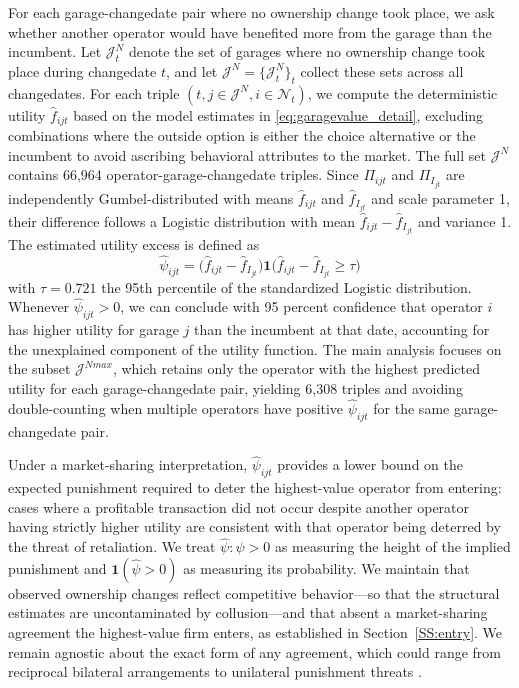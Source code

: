\documentclass[12pt]{article}
\begin{document}
For each garage-changedate pair where no ownership change took place, we 
ask whether another operator would have benefited more from the garage than 
the incumbent. Let $\mathcal{J}^{N}_t$ denote the set of garages where no 
ownership change took place during changedate $t$, and let $\mathcal{J}^N 
= \{\mathcal{J}_t^N\}_{t}$ collect these sets across all changedates. For 
each triple $(t, j \in \mathcal{J}^N, i \in \mathcal{N}_t)$, we compute 
the deterministic utility $\hat{f}_{ijt}$ based on the model estimates 
in \eqref{eq:garagevalue_detail}, excluding combinations where the outside 
option is either the choice alternative or the incumbent to avoid ascribing 
behavioral attributes to the market. The full set $\mathcal{J}^N$ contains 
66,964 operator-garage-changedate triples. Since $\Pi_{ijt}$ and 
$\Pi_{I_{jt}}$ are independently Gumbel-distributed with means 
$\hat{f}_{ijt}$ and $\hat{f}_{I_{jt}}$ and scale parameter 1, their 
difference follows a Logistic distribution with mean $\hat{f}_{ijt} - 
\hat{f}_{I_{jt}}$ and variance 1. The estimated utility excess is defined as
\begin{equation}\label{eq:psi_app}
\hat{\psi}_{ijt} = \big(\hat{f}_{ijt} - \hat{f}_{I_{jt}}\big) 
\mathbf{1}\big(\hat{f}_{ijt} - \hat{f}_{I_{jt}} \geq \tau\big)
\end{equation}
with $\tau = 0.721$ the 95th percentile of the standardized Logistic 
distribution. Whenever $\hat{\psi}_{ijt} > 0$, we can conclude with 95 
percent confidence that operator $i$ has higher utility for garage $j$ than 
the incumbent at that date, accounting for the unexplained component of the 
utility function. The main analysis focuses on the subset $\mathcal{J}^{Nmax}$, 
which retains only the operator with the highest predicted utility for each 
garage-changedate pair, yielding 6,308 triples and avoiding double-counting 
when multiple operators have positive $\hat{\psi}_{ijt}$ for the same 
garage-changedate pair.

Under a market-sharing interpretation, $\hat{\psi}_{ijt}$ provides a lower 
bound on the expected punishment required to deter the highest-value operator 
from entering: cases where a profitable transaction did not occur despite 
another operator having strictly higher utility are consistent with that 
operator being deterred by the threat of retaliation. We treat 
$\hat{\psi}:\hat{\psi}>0$ as measuring the height of the implied punishment and 
$\mathbf{1}(\hat{\psi}>0)$ as measuring its probability. We maintain that 
observed ownership changes reflect competitive behavior---so that the 
structural estimates are uncontaminated by collusion---and that absent a 
market-sharing agreement the highest-value firm enters, as established in 
Section~\ref{SS:entry}. We remain agnostic about the exact form of any 
agreement, which could range from reciprocal bilateral arrangements to 
unilateral punishment threats \citep[see][]{Porter1999, belleflamme2004market}.
\end{document}

